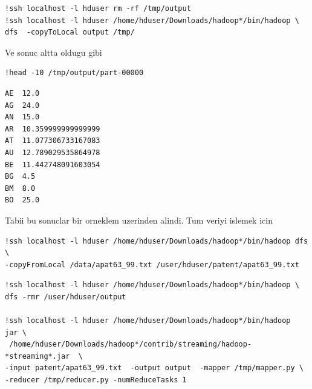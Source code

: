 \documentclass[12pt,fleqn]{article}\usepackage{../common}
\begin{document}
\begin{verbatim}
!ssh localhost -l hduser rm -rf /tmp/output
!ssh localhost -l hduser /home/hduser/Downloads/hadoop*/bin/hadoop \
dfs  -copyToLocal output /tmp/
\end{verbatim}

Ve sonuc altta oldugu gibi

\begin{verbatim}
!head -10 /tmp/output/part-00000
\end{verbatim}

\begin{verbatim}
AE	12.0
AG	24.0
AN	15.0
AR	10.359999999999999
AT	11.077306733167083
AU	12.789029535864978
BE	11.442748091603054
BG	4.5
BM	8.0
BO	25.0
\end{verbatim}

Tabii bu sonuclar bir orneklem uzerinden alindi. Tum veriyi islemek icin

\begin{verbatim}
!ssh localhost -l hduser /home/hduser/Downloads/hadoop*/bin/hadoop dfs \
-copyFromLocal /data/apat63_99.txt /user/hduser/patent/apat63_99.txt
\end{verbatim}

\begin{verbatim}
!ssh localhost -l hduser /home/hduser/Downloads/hadoop*/bin/hadoop \
dfs -rmr /user/hduser/output

!ssh localhost -l hduser /home/hduser/Downloads/hadoop*/bin/hadoop  jar \
 /home/hduser/Downloads/hadoop*/contrib/streaming/hadoop-*streaming*.jar  \
-input patent/apat63_99.txt  -output output  -mapper /tmp/mapper.py \
-reducer /tmp/reducer.py -numReduceTasks 1 
\end{verbatim}
\end{document}
